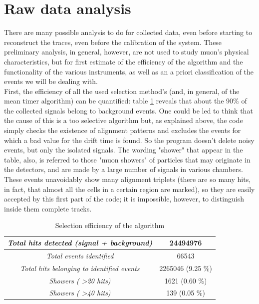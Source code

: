 \documentclass[a4paper,11pt]{book}
\begin{document}
\section{Raw data analysis}

There are many possible analysis to do for collected data, even before starting to reconstruct the traces, even before the calibration of the system. These preliminary analysis, in general, however, are not used to study muon's physical characteristics, but for first estimate of the efficiency of the algorithm and the functionality of the various instruments, as well as an a priori classification of the events we will be dealing with.\\
First, the efficiency of all the used selection method's (and, in general, of the mean timer algorithm) can be quantified: table \ref{tab:trigger_efficiency} reveals that about the 90\% of the collected signals belong to background events. One could be led to think that the cause of this is a too selective algorithm but, as explained above, the code simply checks the existence of alignment patterns and excludes the events for which a bad value for the drift time is found. So the program doesn't delete noisy events, but only the isolated signals. The wording "shower" that appear in the table, also, is referred to those "muon showers" of particles that may originate in the detectors, and are made by a large number of signals in various chambers. These events unavoidably show many alignment triplets (there are so many hits, in fact, that almost all the cells in a certain region are marked), so they are easily accepted by this first part of the code; it is impossible, however, to distinguish inside them complete tracks.
\begin{table}[htbp]
\centering
\begin{tabular}{c|c}
\toprule
\textit{Total hits detected (signal + background)} & 24494976\\
\midrule
\textit{Total events identified} & 66543\\
\midrule
\textit{Total hits belonging to identified events} & 2265046 (9.25 \%)\\
\midrule
\textit{Showers ( \textgreater 20 hits)} & 1621 (0.60 \%)\\
\midrule
\textit{Showers ( \textgreater 40 hits)} & 139 (0.05 \%)\\
\bottomrule
\end{tabular}
\caption{Selection efficiency of the algorithm}
\label{tab:trigger_efficiency}
\end{table}
\end{document}

